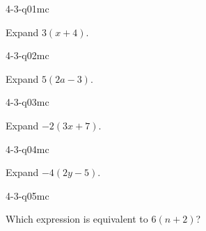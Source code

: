 

\begin{practiceQuestion}{4-3-q01}{mc}
\begin{questionText}
Expand $3(x + 4)$.
\end{questionText}
\end{practiceQuestion}

\begin{practiceQuestion}{4-3-q02}{mc}
\begin{questionText}
Expand $5(2a - 3)$.
\end{questionText}
\end{practiceQuestion}

\begin{practiceQuestion}{4-3-q03}{mc}
\begin{questionText}
Expand $-2(3x + 7)$.
\end{questionText}
\end{practiceQuestion}

\begin{practiceQuestion}{4-3-q04}{mc}
\begin{questionText}
Expand $-4(2y - 5)$.
\end{questionText}
\end{practiceQuestion}

\begin{practiceQuestion}{4-3-q05}{mc}
\begin{questionText}
Which expression is equivalent to $6(n + 2)$?
\end{questionText}
\end{practiceQuestion}

